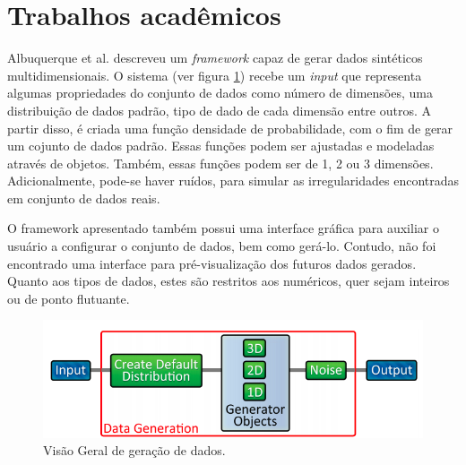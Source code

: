 \documentclass[
	12pt,				%
	openright,			%
	twoside,			%
	a4paper,			%
	english,			%
	brazil				%
	]{abntex2}
\begin{document}
	\section{Trabalhos acadêmicos}
		Albuquerque et al. \cite{Albuquerque2011} descreveu um \emph{framework} capaz de gerar dados sintéticos multidimensionais.
		O sistema (ver figura \ref{fig:albuquerque}) recebe um \emph{input} que representa algumas propriedades do conjunto de dados como número de dimensões,
			uma distribuição de dados padrão,
			tipo de dado de cada dimensão entre outros.
		A partir disso, é criada uma função densidade de probabilidade, com o fim de gerar um cojunto de dados padrão.
		Essas funções podem ser ajustadas e modeladas através de objetos.
		Também, essas funções podem ser de 1, 2 ou 3 dimensões.
		Adicionalmente, pode-se haver ruídos, para simular as irregularidades encontradas em conjunto de dados reais.
		\par
		O framework apresentado também possui uma interface gráfica para auxiliar o usuário a configurar o conjunto de dados, bem como gerá-lo. Contudo, não foi encontrado uma interface para pré-visualização dos futuros dados gerados. Quanto aos tipos de dados, estes são restritos aos numéricos, quer sejam inteiros ou de ponto flutuante.    
		\begin{figure}[h!]
			\centering
			\includegraphics[width=\linewidth]{./figures/TrabalhosRelacionados/Albuquerque10.png}
			\caption{Visão Geral de geração de dados.}
			\label{fig:albuquerque}
		\end{figure}
\end{document}
